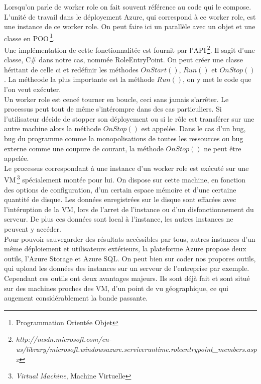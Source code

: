 Lorsqu'on parle de worker role on fait souvent référence au code qui
le compose. L'unité de travail dans le déployement Azure, qui
correspond à ce worker role, est une instance de ce worker role.  On
peut faire ici un parallèle avec un objet et une classe en
POO\,\footnote{Programmation Orientée Objet}.\\


Une implémentation de cette fonctionnalitée est fournit par
l'API\,\footnote{\textit{http://msdn.microsoft.com/en-us/library/microsoft.windowsazure.serviceruntime.roleentrypoint\_members.aspx}}. Il
sagit d'une classe, C\# dans notre cas, nommée RoleEntryPoint. On peut
créer une classe héritant de celle ci et redéfinir les méthodes
$OnStart()$, $Run()$ et $OnStop()$. La métheode la plus importante est
la méthode $Run()$, on y met le code que l'on veut exécuter.\\

Un worker role est cencé tourner en boucle, ceci sans jamais
s'arrêter. Le processus peut tout de même s'intérompre dans des cas
particuliers. Si l'utilisateur décide de stopper son déployement ou si
le rôle est transférer sur une autre machine alors la méthode
$OnStop()$ est appelée. Dans le cas d'un bug, bug du programme comme
la monopolisations de toutes les ressources ou bug externe comme une
coupure de courant, la méthode $OnStop()$ ne peut être appelée.\\

Le processus correspondant à une instance d'un worker role est exécuté
sur une VM\,\footnote{\textit{Virtual Machine}, Machine Virtuelle}
spécialement montée pour lui. On dispose sur cette machine, en
fonction des options de configuration, d'un certain espace mémoire et
d'une certaine quantité de disque. Les données enregistrées sur le
disque sont effacées avec l'intéruption de la VM, lors de l'arret de
l'instance ou d'un disfonctionnement du serveur. De plus ces données
sont local à l'instance, les autres instances ne peuvent y accéder.\\


Pour pouvoir sauvegarder des résultats accéssibles par tous, autres
instances d'un même déploiement et utilisateurs extérieurs, la
plateforme Azure propose deux outils, l'Azure Storage et Azure SQL.
On peut bien sur coder nos propores outils, qui upload les données des
instances sur un serveur de l'entreprise par exemple. Cependant ces
outils ont deux avantages majeurs. Ils sont déjà fait et sont situé
sur des machines proches des VM, d'un point de vu géographique, ce qui
augement considérablement la bande passante.\\


